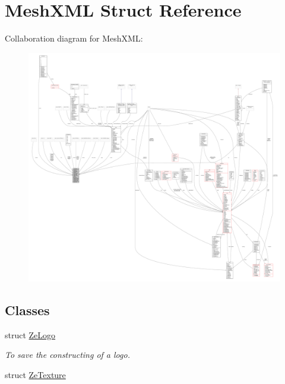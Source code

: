 \hypertarget{structMeshXML}{}\section{Mesh\+X\+ML Struct Reference}
\label{structMeshXML}


Collaboration diagram for Mesh\+X\+ML\+:
\nopagebreak
\begin{figure}[H]
\begin{center}
\leavevmode
\includegraphics[width=350pt]{d6/d4c/structMeshXML__coll__graph}
\end{center}
\end{figure}
\subsection*{Classes}
\begin{DoxyCompactItemize}
\item 
struct \hyperlink{structMeshXML_1_1ZeLogo}{Ze\+Logo}
\begin{DoxyCompactList}\small\item\em To save the constructing of a logo. \end{DoxyCompactList}\item 
struct \hyperlink{structMeshXML_1_1ZeTexture}{Ze\+Texture}
\end{DoxyCompactItemize}
